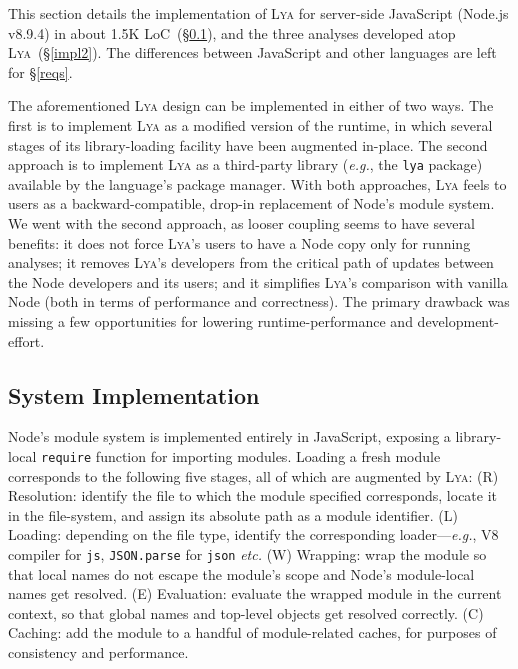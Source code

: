 \documentclass[letterpaper,twocolumn,10pt]{article}
\def\eg{{\em e.g.}, }
\def\etc{{\em etc.}\xspace}
\newcommand{\ttt}[1]{\texttt{#1}}
\newcommand{\sx}[1]{(\S\ref{#1})}
\newcommand{\sys}{{\scshape Lya}\xspace}
\begin{document}
This section details the implementation of \sys for server-side JavaScript (Node.js v8.9.4) in about 1.5K LoC~\sx{impl1},
and the three analyses developed atop \sys~\sx{impl2}.
The differences between JavaScript and other languages are left for \S\ref{reqs}. 

The aforementioned \sys design can be implemented in either of two ways.
The first is to implement \sys as a modified version of the runtime, in which several stages of its library-loading facility have been augmented in-place. %
The second approach is to implement \sys as a third-party library (\eg the \ttt{lya} package) available by the language's package manager.
% 
With both approaches, \sys feels to users as a backward-compatible, drop-in replacement of Node's module system.
We went with the second approach, as looser coupling seems to have several benefits:
  it does not force \sys's users to have a Node copy only for running analyses;
  it removes \sys's developers from the critical path of updates between the Node developers and its users; 
  and it simplifies \sys's comparison with vanilla Node (both in terms of performance and correctness).
The primary drawback was missing a few opportunities for lowering runtime-performance and development-effort.

\subsection{System Implementation}
\label{impl1}


Node's module system is implemented entirely in JavaScript, exposing a library-local \ttt{require} function for importing modules.
Loading a fresh module %
  corresponds to the following five stages, all of which are augmented by \sys:
(R) Resolution: identify the file to which the module specified corresponds, locate it in the file-system, and assign its absolute path as a module identifier.
(L) Loading: depending on the file type, identify the corresponding loader---\eg V8 compiler for \ttt{js}, \ttt{JSON.parse} for \ttt{json} \etc
(W) Wrapping: wrap the module so that local names do not escape the module's scope and Node's module-local names get resolved.
(E) Evaluation: evaluate the wrapped module in the current context, so that global names and top-level objects get resolved correctly.
(C) Caching: add the module to a handful of module-related caches, for purposes of consistency and performance.
\end{document}
